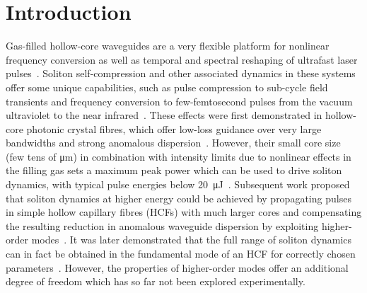 \documentclass[amsmath, preprint, floatfix]{revtex4-2}
\begin{document}
\section{Introduction}
Gas-filled hollow-core waveguides are a very flexible platform for nonlinear frequency conversion as well as temporal and spectral reshaping of ultrafast laser pulses~\cite{travers_ultrafast_2011,russell_hollow-core_2014,nagy_high-energy_2021}. Soliton self-compression and other associated dynamics in these systems offer some unique capabilities, such as pulse compression to sub-cycle field transients and frequency conversion to few-femtosecond pulses from the vacuum ultraviolet to the near infrared~\cite{joly_bright_2011,mak_tunable_2013,ermolov_supercontinuum_2015,travers_high-energy_2019,brahms_infrared_2020}. These effects were first demonstrated in hollow-core photonic crystal fibres, which offer low-loss guidance over very large bandwidths and strong anomalous dispersion~\cite{joly_bright_2011}. However, their small core size (few tens of \si{\micro\meter}) in combination with intensity limits due to nonlinear effects in the filling gas sets a maximum peak power which can be used to drive soliton dynamics, with typical pulse energies below \SI{20}{\micro\joule}~\cite{joly_bright_2011,mak_tunable_2013,ermolov_supercontinuum_2015,kottig_generation_2017}. Subsequent work proposed that soliton dynamics at higher energy could be achieved by propagating pulses in simple hollow capillary fibres (HCFs) with much larger cores and compensating the resulting reduction in anomalous waveguide dispersion by exploiting higher-order modes~\cite{lopez-zubieta_theoretical_2018,lopez-zubieta_spatiotemporal-dressed_2018}. It was later demonstrated that the full range of soliton dynamics can in fact be obtained in the fundamental mode of an HCF for correctly chosen parameters~\cite{travers_high-energy_2019}. However, the properties of higher-order modes offer an additional degree of freedom which has so far not been explored experimentally.
\end{document}
